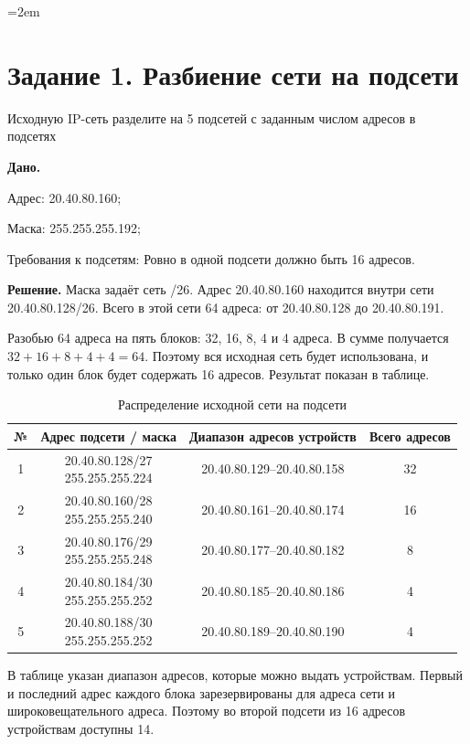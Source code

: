 \documentclass[a4paper, final]{article}
\begin{document}
\emergencystretch=2em


\tableofcontents
\newpage

\section{Задание 1. Разбиение сети на подсети}
Исходную IP-сеть разделите на 5 подсетей с заданным числом адресов в подсетях 

\textbf{Дано.} 

Адрес: 20.40.80.160;

Маска: 255.255.255.192;

Требования к подсетям: Ровно в одной подсети должно быть 16 адресов.

\textbf{Решение.} Маска задаёт сеть /26. Адрес 20.40.80.160 находится внутри сети 20.40.80.128/26. Всего в этой сети 64 адреса: от 20.40.80.128 до 20.40.80.191.

Разобью 64 адреса на пять блоков: 32, 16, 8, 4 и 4 адреса. В сумме получается $32+16+8+4+4=64$. Поэтому вся исходная сеть будет использована, и только один блок будет содержать 16 адресов. Результат показан в таблице.

\begin{table}[ht]
\centering
\small
\caption{Распределение исходной сети на подсети}
\begin{tabular}{|c|c|c|c|}
\hline
№ & Адрес подсети / маска & Диапазон адресов устройств & Всего адресов \\
\hline
1 & \makecell{20.40.80.128/27\\255.255.255.224} & 20.40.80.129--20.40.80.158 & 32 \\
\hline
2 & \makecell{20.40.80.160/28\\255.255.255.240} & 20.40.80.161--20.40.80.174 & 16 \\
\hline
3 & \makecell{20.40.80.176/29\\255.255.255.248} & 20.40.80.177--20.40.80.182 & 8 \\
\hline
4 & \makecell{20.40.80.184/30\\255.255.255.252} & 20.40.80.185--20.40.80.186 & 4 \\
\hline
5 & \makecell{20.40.80.188/30\\255.255.255.252} & 20.40.80.189--20.40.80.190 & 4 \\
\hline
\end{tabular}
\end{table}

В таблице указан диапазон адресов, которые можно выдать устройствам. Первый и последний адрес каждого блока зарезервированы для адреса сети и широковещательного адреса. Поэтому во второй подсети из 16 адресов устройствам доступны 14.
\end{document}
